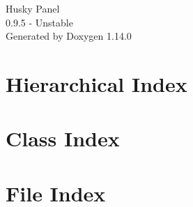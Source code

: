 \documentclass[twoside]{book}
\newcommand{\+}{\discretionary{\mbox{\scriptsize$\hookleftarrow$}}{}{}}
\newcommand{\clearemptydoublepage}{%
    \newpage{\pagestyle{empty}\cleardoublepage}%
  }
\begin{document}
  \raggedbottom
    \hypersetup{pageanchor=false,
                bookmarksnumbered=true,
                pdfencoding=unicode
               }
  \begin{titlepage}
  \vspace*{7cm}
  \begin{center}%
  {\Large Husky Panel}\\
  [1ex]\large 0.\+9.\+5 -\/ Unstable \\
  \vspace*{1cm}
  {\large Generated by Doxygen 1.14.0}\\
  \end{center}
  \end{titlepage}
  \clearemptydoublepage
  \tableofcontents
  \clearemptydoublepage
  \hypersetup{pageanchor=true}
\chapter{Hierarchical Index}

\chapter{Class Index}

\chapter{File Index}

\end{document}

